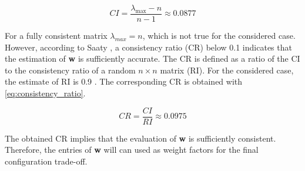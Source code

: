 

\begin{equation}
\label{eq:cost_index}
    CI = \frac{\lambda_\text{max}-n}{n-1}\approx0.0877
\end{equation}

For a fully consistent matrix $\lambda_{max} = n$, which is not true for the considered case. However, according to Saaty \cite{SAATY19909}, a consistency ratio (CR) below 0.1 indicates that the estimation of \textbf{w} is sufficiently accurate. The CR is defined as a ratio of the CI to the consistency ratio of a random $n\times n$ matrix (RI). For the considered case, the estimate of RI is 0.9 \cite{DecisionMakingAHP}. The corresponding CR is obtained with \autoref{eq:consistency_ratio}.

\begin{equation}
\label{eq:consistency_ratio}
    CR = \frac{CI}{RI} \approx 0.0975
\end{equation}

The obtained CR implies that the evaluation of \textbf{w} is sufficiently consistent. Therefore, the entries of \textbf{w} will can used as weight factors for the final configuration trade-off.
    


